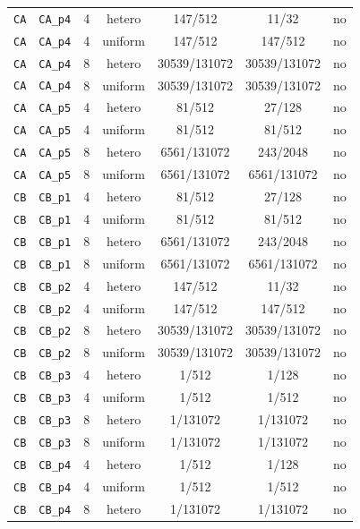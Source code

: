 \documentclass[11pt]{article}
\begin{document}
\begin{table}[ht]
\begin{tabular}{@{}lllcccc@{}}
\texttt{CA} & \texttt{CA\_p4} & 4 & hetero & 147/512 & 11/32 & no \\
\texttt{CA} & \texttt{CA\_p4} & 4 & uniform & 147/512 & 147/512 & no \\
\texttt{CA} & \texttt{CA\_p4} & 8 & hetero & 30539/131072 & 30539/131072 & no \\
\texttt{CA} & \texttt{CA\_p4} & 8 & uniform & 30539/131072 & 30539/131072 & no \\
\texttt{CA} & \texttt{CA\_p5} & 4 & hetero & 81/512 & 27/128 & no \\
\texttt{CA} & \texttt{CA\_p5} & 4 & uniform & 81/512 & 81/512 & no \\
\texttt{CA} & \texttt{CA\_p5} & 8 & hetero & 6561/131072 & 243/2048 & no \\
\texttt{CA} & \texttt{CA\_p5} & 8 & uniform & 6561/131072 & 6561/131072 & no \\
\texttt{CB} & \texttt{CB\_p1} & 4 & hetero & 81/512 & 27/128 & no \\
\texttt{CB} & \texttt{CB\_p1} & 4 & uniform & 81/512 & 81/512 & no \\
\texttt{CB} & \texttt{CB\_p1} & 8 & hetero & 6561/131072 & 243/2048 & no \\
\texttt{CB} & \texttt{CB\_p1} & 8 & uniform & 6561/131072 & 6561/131072 & no \\
\texttt{CB} & \texttt{CB\_p2} & 4 & hetero & 147/512 & 11/32 & no \\
\texttt{CB} & \texttt{CB\_p2} & 4 & uniform & 147/512 & 147/512 & no \\
\texttt{CB} & \texttt{CB\_p2} & 8 & hetero & 30539/131072 & 30539/131072 & no \\
\texttt{CB} & \texttt{CB\_p2} & 8 & uniform & 30539/131072 & 30539/131072 & no \\
\texttt{CB} & \texttt{CB\_p3} & 4 & hetero & 1/512 & 1/128 & no \\
\texttt{CB} & \texttt{CB\_p3} & 4 & uniform & 1/512 & 1/512 & no \\
\texttt{CB} & \texttt{CB\_p3} & 8 & hetero & 1/131072 & 1/131072 & no \\
\texttt{CB} & \texttt{CB\_p3} & 8 & uniform & 1/131072 & 1/131072 & no \\
\texttt{CB} & \texttt{CB\_p4} & 4 & hetero & 1/512 & 1/128 & no \\
\texttt{CB} & \texttt{CB\_p4} & 4 & uniform & 1/512 & 1/512 & no \\
\texttt{CB} & \texttt{CB\_p4} & 8 & hetero & 1/131072 & 1/131072 & no \\

\end{tabular}
\end{table}
\end{document}
